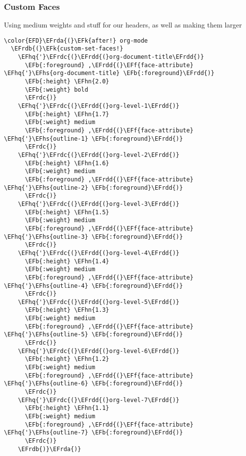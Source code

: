 \documentclass{article}
\newcommand{\EFk}[1]{\textcolor{EFk}{#1}} %
\newcommand{\EFb}[1]{\textcolor{EFb}{#1}} %
\newcommand{\EFf}[1]{\textcolor{EFf}{#1}} %
\newcommand{\EFhn}[1]{\textcolor{EFhn}{\textbf{#1}}} %
\newcommand{\EFhq}[1]{#1} %
\newcommand{\EFhs}[1]{\textcolor{EFhs}{#1}} %
\newcommand{\EFrda}[1]{\textcolor{EFrda}{#1}} %
\newcommand{\EFrdb}[1]{\textcolor{EFrdb}{#1}} %
\newcommand{\EFrdc}[1]{\textcolor{EFrdc}{#1}} %
\newcommand{\EFrdd}[1]{\textcolor{EFrdd}{#1}} %
\begin{document}
\subsubsection{Custom Faces}
\label{sec:org03fc75d}
Using medium weights and stuff for our headers, as well as making them larger
\begin{Code}
\begin{Verbatim}
\color{EFD}\EFrda{(}\EFk{after!} org-mode
  \EFrdb{(}\EFk{custom-set-faces!}
    \EFhq{'}\EFrdc{(}\EFrdd{(}org-document-title\EFrdd{)}
      \EFb{:foreground} ,\EFrdd{(}\EFf{face-attribute} \EFhq{'}\EFhs{org-document-title} \EFb{:foreground}\EFrdd{)}
      \EFb{:height} \EFhn{2.0}
      \EFb{:weight} bold
      \EFrdc{)}
    \EFhq{'}\EFrdc{(}\EFrdd{(}org-level-1\EFrdd{)}
      \EFb{:height} \EFhn{1.7}
      \EFb{:weight} medium
      \EFb{:foreground} ,\EFrdd{(}\EFf{face-attribute} \EFhq{'}\EFhs{outline-1} \EFb{:foreground}\EFrdd{)}
      \EFrdc{)}
    \EFhq{'}\EFrdc{(}\EFrdd{(}org-level-2\EFrdd{)}
      \EFb{:height} \EFhn{1.6}
      \EFb{:weight} medium
      \EFb{:foreground} ,\EFrdd{(}\EFf{face-attribute} \EFhq{'}\EFhs{outline-2} \EFb{:foreground}\EFrdd{)}
      \EFrdc{)}
    \EFhq{'}\EFrdc{(}\EFrdd{(}org-level-3\EFrdd{)}
      \EFb{:height} \EFhn{1.5}
      \EFb{:weight} medium
      \EFb{:foreground} ,\EFrdd{(}\EFf{face-attribute} \EFhq{'}\EFhs{outline-3} \EFb{:foreground}\EFrdd{)}
      \EFrdc{)}
    \EFhq{'}\EFrdc{(}\EFrdd{(}org-level-4\EFrdd{)}
      \EFb{:height} \EFhn{1.4}
      \EFb{:weight} medium
      \EFb{:foreground} ,\EFrdd{(}\EFf{face-attribute} \EFhq{'}\EFhs{outline-4} \EFb{:foreground}\EFrdd{)}
      \EFrdc{)}
    \EFhq{'}\EFrdc{(}\EFrdd{(}org-level-5\EFrdd{)}
      \EFb{:height} \EFhn{1.3}
      \EFb{:weight} medium
      \EFb{:foreground} ,\EFrdd{(}\EFf{face-attribute} \EFhq{'}\EFhs{outline-5} \EFb{:foreground}\EFrdd{)}
      \EFrdc{)}
    \EFhq{'}\EFrdc{(}\EFrdd{(}org-level-6\EFrdd{)}
      \EFb{:height} \EFhn{1.2}
      \EFb{:weight} medium
      \EFb{:foreground} ,\EFrdd{(}\EFf{face-attribute} \EFhq{'}\EFhs{outline-6} \EFb{:foreground}\EFrdd{)}
      \EFrdc{)}
    \EFhq{'}\EFrdc{(}\EFrdd{(}org-level-7\EFrdd{)}
      \EFb{:height} \EFhn{1.1}
      \EFb{:weight} medium
      \EFb{:foreground} ,\EFrdd{(}\EFf{face-attribute} \EFhq{'}\EFhs{outline-7} \EFb{:foreground}\EFrdd{)}
      \EFrdc{)}
    \EFrdb{)}\EFrda{)}
\end{Verbatim}
\end{Code}
\end{document}
